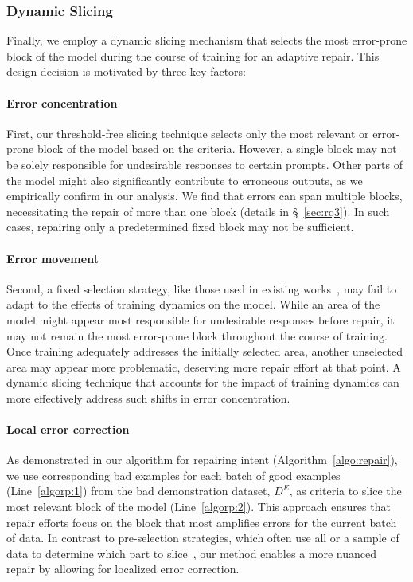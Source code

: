 \subsubsection{Dynamic Slicing}
Finally, we employ a dynamic slicing mechanism that selects the most error-prone block of the model during the course of training for an adaptive repair. This design decision is motivated by three key factors:
\paragraph{Error concentration} First, our threshold-free slicing technique selects only the most relevant or error-prone block of the model based on the criteria. However, a single block may not be solely responsible for undesirable responses to certain prompts. Other parts of the model might also significantly contribute to erroneous outputs, as we empirically confirm in our analysis. We find that errors can span multiple blocks, necessitating the repair of more than one block (details in \S~\ref{sec:rq3}). In such cases, repairing only a predetermined fixed block may not be sufficient.

\paragraph{Error movement} Second, a fixed selection strategy, like those used in existing works~\cite{zhang2020dynamic, zhang2022remos}, may fail to adapt to the effects of training dynamics on the model. While an area of the model might appear most responsible for undesirable responses before repair, it may not remain the most error-prone block throughout the course of training. Once training adequately addresses the initially selected area, another unselected area may appear more problematic, deserving more repair effort at that point. A dynamic slicing technique that accounts for the impact of training dynamics can more effectively address such shifts in error concentration.


\paragraph{Local error correction}

As demonstrated in our algorithm for repairing intent (Algorithm~\ref{algo:repair}), we use corresponding bad examples for each batch of good examples (Line~\ref{algorp:1}) from the bad demonstration dataset, \( D^E \), as criteria to slice the most relevant block of the model (Line~\ref{algorp:2}). This approach ensures that repair efforts focus on the block that most amplifies errors for the current batch of data. In contrast to pre-selection strategies, which often use all or a sample of data to determine which part to slice~\cite{zhang2020dynamic, zhang2022remos}, our method enables a more nuanced repair by allowing for localized error correction.





